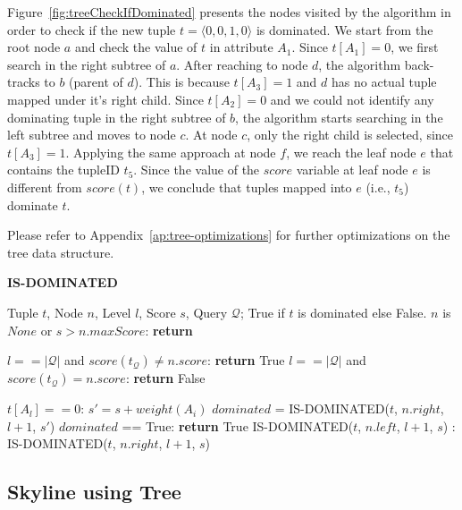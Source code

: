 Figure~\ref{fig:treeCheckIfDominated} presents the nodes visited by the algorithm in order to check if the new tuple $t = \langle 0,0,1,0 \rangle$ is dominated. We start from the root node $a$ and check the value of $t$ in attribute $A_1$. Since $t[A_1] = 0$, we first search in the right subtree of $a$. After reaching to node $d$, the algorithm back-tracks to $b$ (parent of $d$). This is because $t[A_3] = 1$ and $d$ has no actual tuple mapped under it's right child. Since $t[A_2] = 0$ and we could not identify any dominating tuple in the right subtree of $b$, the algorithm starts searching in the left subtree and moves to node $c$. At node $c$, only the right child is selected, since $t[A_3] = 1$. Applying the same approach at node $f$, we reach the leaf node $e$ that contains the tupleID $t_5$. Since the value of the $score$ variable at leaf node $e$ is different from $score(t)$, we conclude that tuples mapped into $e$ (i.e., $t_5$) dominate $t$.

Please refer to Appendix~\ref{ap:tree-optimizations} for further optimizations on the tree data structure.

\begin{algorithm}[htb]
\caption{{\bf IS-DOMINATED}}
\begin{algorithmic}[1]
\label{alg:isDominated}
 Tuple $t$, Node $n$, Level $l$, Score $s$, Query $\mathcal{Q}$;  True if $t$ is dominated else False.
 $n$ is $None$ or $s > n.maxScore$: {\bf return}

 $l == |\mathcal{Q}|$ and $score(t_{\mathcal{Q}}) \neq n.score$: {\bf return} True
 $l == |\mathcal{Q}|$ and $score(t_{\mathcal{Q}}) = n.score$: {\bf return} False

 $t[A_l] == 0$:
    \STATE \hindent $s' = s + weight(A_i)$
    \STATE \hindent $dominated$ = IS-DOMINATED($t$, $n.right$, $l+1$, $s'$)
    \STATE {} $dominated$ == True: {\bf return} True
    \STATE {} IS-DOMINATED($t$, $n.left$, $l+1$, $s$)
:
    \STATE {} IS-DOMINATED($t$, $n.right$, $l+1$, $s$)
\end{algorithmic}
\end{algorithm}



\subsection{Skyline using Tree}\label{sec:ST}

